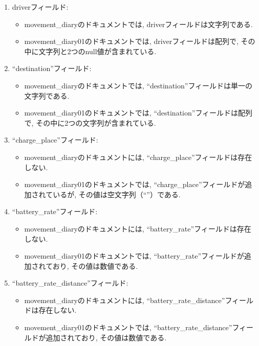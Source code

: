 \documentclass[a4j,12pt,]{jarticle}
\begin{document}
\begin{enumerate}
\item driverフィールド: 
\begin{itemize}
\item movement\_diaryのドキュメントでは, driverフィールドは文字列である.
\item movement\_diary01のドキュメントでは, driverフィールドは配列で, その中に文字列と2つのnull値が含まれている.
\end{itemize}

\item ``destination''フィールド: 
\begin{itemize}
\item movement\_diaryのドキュメントでは, ``destination''フィールドは単一の文字列である.
\item movement\_diary01のドキュメントでは, ``destination''フィールドは配列で, その中に2つの文字列が含まれている.
\end{itemize}

\item ``charge\_place''フィールド: 
\begin{itemize}
\item movement\_diaryのドキュメントには, ``charge\_place''フィールドは存在しない.
\item movement\_diary01のドキュメントでは, ``charge\_place''フィールドが追加されているが, その値は空文字列（``''）である.
\end{itemize}

\item ``battery\_rate''フィールド: 
\begin{itemize}
\item movement\_diaryのドキュメントには, ``battery\_rate''フィールドは存在しない.
\item movement\_diary01のドキュメントでは, ``battery\_rate''フィールドが追加されており, その値は数値である.
\end{itemize}

\item ``battery\_rate\_distance''フィールド: 
\begin{itemize}
\item movement\_diaryのドキュメントには, ``battery\_rate\_distance''フィールドは存在しない.
\item movement\_diary01のドキュメントでは, ``battery\_rate\_distance''フィールドが追加されており, その値は数値である.
\end{itemize}

\end{enumerate}
\end{document}
